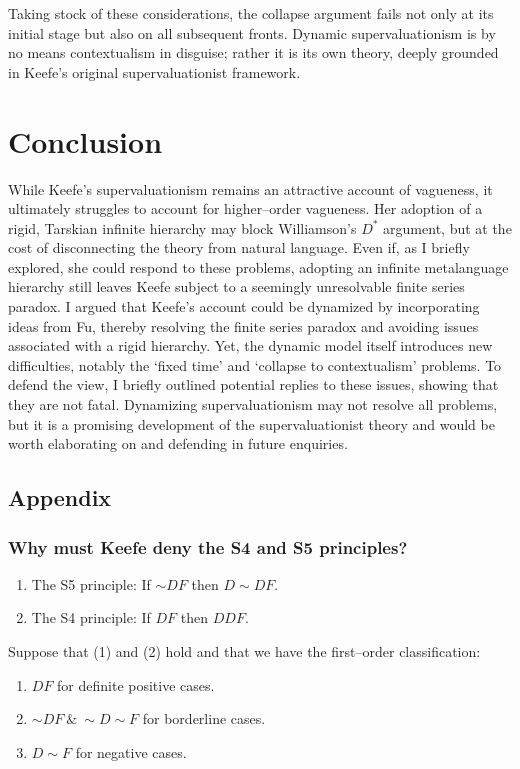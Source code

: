 Taking stock of these considerations, the collapse argument fails not
only at its initial stage but also on all subsequent fronts. Dynamic
supervaluationism is by no means contextualism in disguise; rather it is
its own theory, deeply grounded in Keefe's original supervaluationist
framework.

\section{Conclusion}

While Keefe's supervaluationism remains an attractive account of
vagueness, it ultimately struggles to account for higher--order
vagueness. Her adoption of a rigid, Tarskian infinite hierarchy may
block Williamson's $D^*$ argument, but at the cost of disconnecting the
theory from natural language. Even if, as I briefly explored, she could
respond to these problems, adopting an infinite metalanguage hierarchy
still leaves Keefe subject to a seemingly unresolvable finite series
paradox. I argued that Keefe's account could be dynamized by
incorporating ideas from Fu, thereby resolving the finite series paradox
and avoiding issues associated with a rigid hierarchy. Yet, the dynamic
model itself introduces new difficulties, notably the `fixed time' and
`collapse to contextualism' problems. To defend the view, I briefly
outlined potential replies to these issues, showing that they are not
fatal. Dynamizing supervaluationism may not resolve all problems, but it
is a promising development of the supervaluationist theory and would be
worth elaborating on and defending in future enquiries.

\subsection*{Appendix}

\subsubsection*{Why must Keefe deny the S4 and S5 principles?}

\begin{enumerate}
\def\labelenumi{(\arabic{enumi})}
\item The S5 principle: If ${\sim}DF$ then $D{\sim}DF$.
\item The S4 principle: If $DF$ then $DDF$. 
\end{enumerate}
Suppose that (1) and (2) hold and that we have the first--order
classification:
\begin{enumerate}
  \def\labelenumi{(\roman{enumi})}
\item{$DF$ for definite positive cases.}
\item{${\sim}DF \ \& \ {\sim}D{\sim}F$ for borderline cases.}
  \item{$D{\sim}F$ for negative cases.}
  \end{enumerate}

